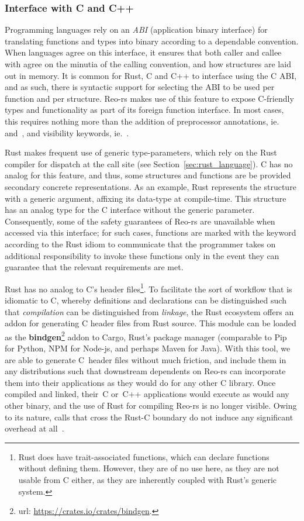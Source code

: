 \subsubsection{Interface with C and C++}
Programming languages rely on an \textit{ABI} (application binary interface) for translating functions and types into binary according to a dependable convention. When languages agree on this interface, it ensures that both caller and callee with agree on the minutia of the calling convention, and how structures are laid out in memory. It is common for Rust, C and C++ to interface using the C ABI, and as such, there is syntactic support for selecting the ABI to be used per function and per structure. Reo-rs makes use of this feature to expose C-friendly types and functionality as part of its foreign function interface. In most cases, this requires nothing more than the addition of preprocessor annotations, ie.\ \code{\#[repr(C)]} and~\code{\#[no\_mangle]}, and visibility keywords, ie.~.

Rust makes frequent use of generic type-parameters, which rely on the Rust compiler for dispatch at the call site (see Section~\ref{sec:rust_language}). C has no analog for this feature, and thus, some structures and functions are be provided secondary concrete representations. As an example, Rust represents the  structure with a generic argument, affixing its data-type at compile-time. This structure has an analog type for the C interface without the generic parameter. Consequently, some of the safety guarantees of Reo-rs are unavailable when accessed via this interface; for such cases, functions are marked with the  keyword according to the Rust idiom to communicate that the programmer takes on additional responsibility to invoke these functions only in the event they can guarantee that the relevant requirements are met.

Rust has no analog to C's header files\footnote{Rust does have trait-associated functions, which can declare functions without defining them. However, they are of no use here, as they are not usable from C either, as they are inherently coupled with Rust's generic system.}. To facilitate the sort of workflow that is idiomatic to C, whereby definitions and declarations can be distinguished such that \textit{compilation} can be distinguished from \textit{linkage}, the Rust ecosystem offers an addon for generating C header files from Rust source. This module can be loaded as the \textbf{bindgen}\footnote{url: \url{https://crates.io/crates/bindgen}.} addon to Cargo, Rust's package manager (comparable to Pip for Python, NPM for Node-js, and perhaps Maven for Java). With this tool, we are able to generate C~header files without much friction, and include them in any distributions such that downstream dependents on Reo-rs can incorporate them into their applications as they would do for any other C library. Once compiled and linked, their~C or~C++ applications would execute as would any other binary, and the use of Rust for compiling Reo-rs is no longer visible. Owing to its nature, calls that cross the Rust-C boundary do not induce any significant overhead at all~\cite{klabnik2018rust}.

